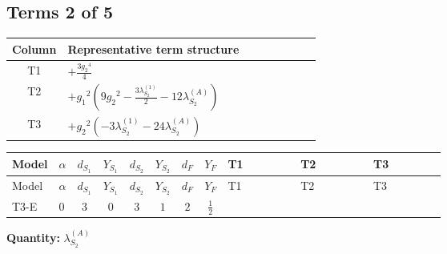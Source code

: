 \documentclass[8pt]{article}
\begin{document}
\begin{landscape}
\subsection*{Terms 2 of 5}
\begin{center}
\begin{tabular}{@{}c >{\raggedright\arraybackslash}p{0.82\linewidth}@{}}
\toprule
Column & Representative term structure \\
\midrule
T1 & \(\displaystyle +\frac{3 {g_2}^4}{4}\) \\
\midrule
T2 & \(\displaystyle +{g_1}^2 \left(9 {g_2}^2-\frac{3 {\lambda_{S_2}^{(1)}}}{2}-12 {\lambda_{S_2}^{(A)}}\right)\) \\
\midrule
T3 & \(\displaystyle +{g_2}^2 (-3 {\lambda_{S_2}^{(1)}}-24 {\lambda_{S_2}^{(A)}})\) \\
\midrule
\bottomrule
\end{tabular}
\end{center}
\smallskip
\tiny
\begin{longtable}{@{}llcccccc >{\raggedright\arraybackslash}p{0.21\linewidth} >{\raggedright\arraybackslash}p{0.21\linewidth} >{\raggedright\arraybackslash}p{0.21\linewidth}@{}}
\toprule
Model & $\alpha$ & $d_{S_1}$ & $Y_{S_1}$ & $d_{S_2}$ & $Y_{S_2}$ & $d_F$ & $Y_F$ & T1 & T2 & T3 \\
\midrule
\endfirsthead
\toprule
Model & $\alpha$ & $d_{S_1}$ & $Y_{S_1}$ & $d_{S_2}$ & $Y_{S_2}$ & $d_F$ & $Y_F$ & T1 & T2 & T3 \\
\midrule
\endhead
T3-E & $0$ & $3$ & $0$ & $3$ & $1$ & $2$ & $\frac{1}{2}$ & \scriptsize\adjustbox{max width=\linewidth}{$\begin{gathered} +\frac{3 {g_2}^4}{4}\end{gathered}$} & \scriptsize\adjustbox{max width=\linewidth}{$\begin{gathered} +{g_1}^2 \left(9 {g_2}^2-\frac{3 {\lambda_{S_2}^{(1)}}}{2}-12 {\lambda_{S_2}^{(A)}}\right)\end{gathered}$} & \scriptsize\adjustbox{max width=\linewidth}{$\begin{gathered} +{g_2}^2 (-3 {\lambda_{S_2}^{(1)}}-24 {\lambda_{S_2}^{(A)}})\end{gathered}$} \\
\midrule
\bottomrule
\end{longtable}
\clearpage
\noindent\textbf{Quantity: }$\lambda_{S_2}^{(A)}$\par\smallskip

\end{landscape}
\end{document}
